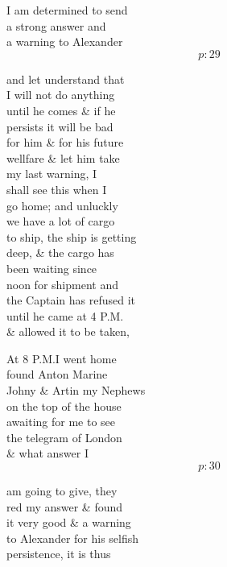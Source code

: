 \documentclass{report}
\begin{document}
	\par{
 	I am determined to send\ \\a strong answer and\ \\a warning to Alexander\ \\
  \[p: 29 \]

	}


	\par{
 	and let understand that\ \\I will not do anything\ \\until he comes \& if he\ \\persists it will be bad\ \\for him \& for his future\ \\wellfare \& let him take\ \\my last warning, I\ \\shall see this when I\ \\go home; and unluckly\ \\we have a lot of cargo\ \\to ship, the ship is getting\ \\deep, \& the cargo has\ \\been waiting since\ \\noon for shipment and\ \\the Captain has refused it\ \\until he came at 4 P.M.\ \\\& allowed it to be taken,\ \\
	}

	\par{
 	At 8 P.M.I went home\ \\found Anton Marine\ \\Johny \& Artin my Nephews\ \\on the top of the house\ \\awaiting for me to see\ \\the telegram of London\ \\\& what answer I\ \\
  \[p: 30 \]

	}

	\marginpar{}

	\par{
 	am going to give, they\ \\red my answer \& found\ \\it very good \& a warning\ \\to Alexander for his selfish\ \\persistence, it is thus\ \\
	}
\end{document}

